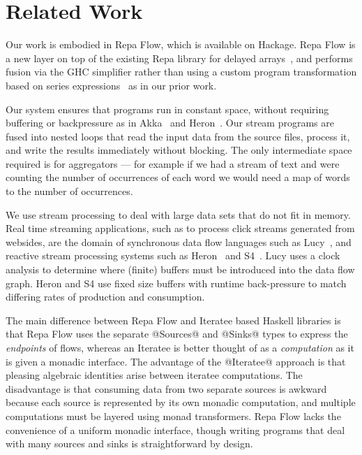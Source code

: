 \section{Related Work}
Our work is embodied in Repa Flow, which is available on Hackage. Repa Flow is a new layer on top of the existing Repa library for delayed arrays~\cite{Lippmeier:Guiding}, and performs fusion via the GHC simplifier rather than using a custom program transformation based on series expressions~\cite{Lippmeier:DataFlow} as in our prior work.

Our system ensures that programs run in constant space, without requiring buffering or backpressure as in Akka~\cite{github:akka} and Heron~\cite{Kulkarn:Heron}. Our stream programs are fused into nested loops that read the input data from the source files, process it, and write the results immediately without blocking. The only intermediate space required is for aggregators --- for example if we had a stream of text and were counting the number of occurrences of each word we would need a map of words to the number of occurrences. 

We use stream processing to deal with large data sets that do not fit in memory. Real time streaming applications, such as to process click streams generated from websides, are the domain of synchronous data flow languages such as Lucy~\cite{Mandel:Lucy}, and reactive stream processing systems such as Heron~\cite{Kulkarn:Heron} and S4~\cite{Neumeyer:S4}. Lucy uses a clock analysis to determine where (finite) buffers must be introduced into the data flow graph. Heron and S4 use fixed size buffers with runtime back-pressure to match differing rates of production and consumption.

The main difference between Repa Flow and Iteratee based Haskell libraries 
\cite{Kiselyov:iteratee, hackage:enumerator, hackage:conduit, hackage:pipes} is that Repa Flow uses the separate @Sources@ and @Sinks@ types to express the \emph{endpoints} of flows, whereas an Iteratee is better thought of as a \emph{computation} as it is given a monadic interface. The advantage of the @Iteratee@ approach is that pleasing algebraic identities arise between iteratee computations. The disadvantage is that consuming data from two separate sources is awkward because each source is represented by its own monadic computation, and multiple computations must be layered using monad transformers. Repa Flow lacks the convenience of a uniform monadic interface, though writing programs that deal with many sources and sinks is straightforward by design.

